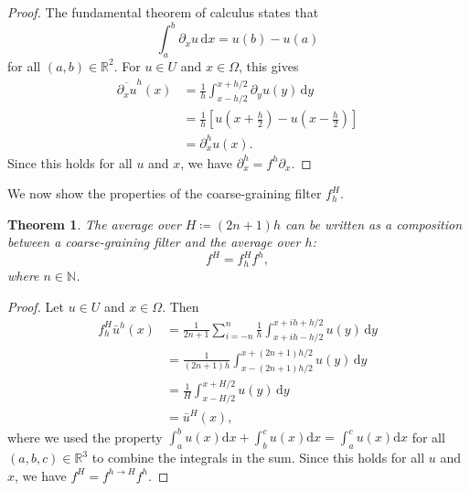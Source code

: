 \documentclass[preprint,twocolumn,5p]{elsarticle}
\newtheorem{theorem}{Theorem}
\begin{document}
\begin{proof}
    The fundamental theorem of calculus states that
    \begin{equation}
        \int_a^b \partial_x u \, \mathrm{d} x = u(b) - u(a)
    \end{equation}
    for all $(a, b) \in \mathbb{R}^2$.
    For $u \in U$ and $x \in \Omega$, this gives
    \begin{equation}
        \begin{split}
            \overline{\partial_x u}^h(x)
            & = \frac{1}{h} \int_{x -h / 2}^{x + h / 2} \partial_y u(y) \, \mathrm{d} y \\
            & = \frac{1}{h} \left[ u\left(x + \frac{h}{2}\right) - u\left(x - \frac{h}{2}\right) \right] \\
            & = \partial^h_x u(x).
        \end{split}
    \end{equation}
    Since this holds for all $u$ and $x$, we have $\partial^h_x = f^h \partial_x$.
\end{proof}

We now show the properties of the coarse-graining filter $f^H_h$.

\begin{theorem} \label{th:filterlevels}
    The average over $H \coloneq (2 n + 1) h$ can be written as a composition
    between
    a coarse-graining filter and the average over $h$:
    \begin{equation}
        f^H = f^H_h f^h,
    \end{equation}
    where $n \in \mathbb{N}$.
\end{theorem}

\begin{proof}
    Let $u \in U$ and $x \in \Omega$. Then
    \begin{equation}
    \begin{split}
        f^H_h \bar{u}^h(x)
        & = \frac{1}{2 n + 1}
        \sum_{i = -n}^n
        \frac{1}{h}
        \int_{x + i h - h/2}^{x + i h + h/2}
        u(y) \, \mathrm{d} y \\
        & = \frac{1}{(2 n + 1) h} \int_{x - (2 n + 1) h / 2}^{x + (2 n + 1) h / 2} u(y) \, \mathrm{d} y \\
        & = \frac{1}{H} \int_{x - H / 2}^{x + H / 2} u(y) \, \mathrm{d} y \\
        & = \bar{u}^H(x),
    \end{split}
    \end{equation}
    where we used the property
    $\int_a^b u(x) \mathrm{d} x
    + \int_b^c u(x) \mathrm{d} x
    = \int_a^c u(x) \mathrm{d} x$
    for all $(a, b, c) \in \mathbb{R}^3$
    to combine the integrals in the sum.
    Since this holds for all $u$ and $x$, we have $f^H = f^{h \to H} f^h$.
\end{proof}
\end{document}
